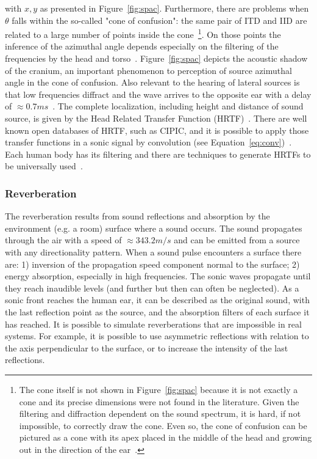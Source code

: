 \noindent with $x,y$ as presented in Figure~\ref{fig:spac}.
Furthermore, there are problems when $\theta$ falls within the so-called "cone of confusion": the same pair of ITD and IID are related to a large number of points inside the cone~\footnote{The cone itself is not shown in Figure~\ref{fig:spac} because it is not exactly a cone and its precise dimensions were not found in the literature. Given the filtering and diffraction dependent on the sound spectrum, it is hard, if not impossible, to correctly draw the cone. Even so, the cone of confusion can be pictured as a cone with its apex placed in the middle of the head and growing out in the direction of the ear~\cite{hrtf}.}.
On those points the inference of the azimuthal angle depends especially on the filtering of the frequencies by the head and torso~\cite{Heeger,hrtf}.
Figure~\ref{fig:spac} depicts the acoustic shadow of the cranium, an important phenomenon to perception of source azimuthal angle in the cone of confusion. Also relevant to the hearing of lateral sources is that low frequencies diffract and the wave arrives to the opposite ear with a delay of $\approx 0.7ms$~\cite{floEsp}. 
The complete localization, including height and distance of sound source, is given by the Head Related Transfer Function (HRTF)~\cite{hrtf}. There are well known open databases of HRTF, such as CIPIC, and it is possible to apply those transfer functions in a sonic signal by convolution (see Equation~\ref{eq:conv})~\cite{CIPIC}. Each human body has its filtering and there are techniques to generate HRTFs to be universally used~\cite{lazaSPA}. 

\subsubsection{Reverberation}
The reverberation results from sound reflections and absorption by the environment (e.g. a room) surface where a sound occurs.
The sound propagates through the air with a speed of $\approx 343.2m/s$ and can be emitted from a source with any directionality pattern. When a sound pulse encounters a surface there are: 1) inversion of the propagation speed component normal to the surface;  2) energy absorption, especially in high frequencies.
The sonic waves propagate until they reach inaudible levels (and further but then can often be neglected).
As a sonic front reaches the human ear, it can be described as the original sound, with the last reflection point as the source, and the absorption filters of each surface it has reached.
It is possible to simulate reverberations that are impossible in real systems. For example, it is possible to use asymmetric reflections with relation to the axis perpendicular to the surface, or to increase the intensity of the last reflections.

